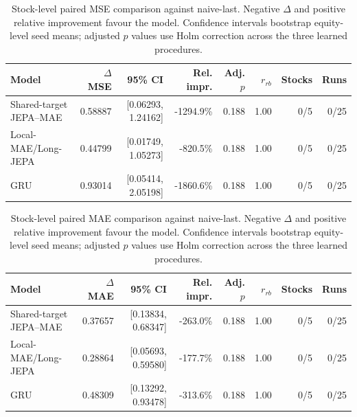 \begin{table}[t]
\centering
\small
\caption{Stock-level paired MSE comparison against naive-last. Negative $\Delta$ and positive relative improvement favour the model. Confidence intervals bootstrap equity-level seed means; adjusted $p$ values use Holm correction across the three learned procedures.}
\label{tab:paired_mse_naive}
\begin{tabular}{lrrrrrrr}
\toprule
Model & $\Delta$MSE & 95\% CI & Rel. impr. & Adj. $p$ & $r_{rb}$ & Stocks & Runs \\
\midrule
Shared-target JEPA--MAE & 0.58887 & [0.06293, 1.24162] & -1294.9\% & 0.188 & 1.00 & 0/5 & 0/25 \\
Local-MAE/Long-JEPA & 0.44799 & [0.01749, 1.05273] & -820.5\% & 0.188 & 1.00 & 0/5 & 0/25 \\
GRU & 0.93014 & [0.05414, 2.05198] & -1860.6\% & 0.188 & 1.00 & 0/5 & 0/25 \\
\bottomrule
\end{tabular}
\end{table}

\begin{table}[t]
\centering
\small
\caption{Stock-level paired MAE comparison against naive-last. Negative $\Delta$ and positive relative improvement favour the model. Confidence intervals bootstrap equity-level seed means; adjusted $p$ values use Holm correction across the three learned procedures.}
\label{tab:paired_mae_naive}
\begin{tabular}{lrrrrrrr}
\toprule
Model & $\Delta$MAE & 95\% CI & Rel. impr. & Adj. $p$ & $r_{rb}$ & Stocks & Runs \\
\midrule
Shared-target JEPA--MAE & 0.37657 & [0.13834, 0.68347] & -263.0\% & 0.188 & 1.00 & 0/5 & 0/25 \\
Local-MAE/Long-JEPA & 0.28864 & [0.05693, 0.59580] & -177.7\% & 0.188 & 1.00 & 0/5 & 0/25 \\
GRU & 0.48309 & [0.13292, 0.93478] & -313.6\% & 0.188 & 1.00 & 0/5 & 0/25 \\
\bottomrule
\end{tabular}
\end{table}

